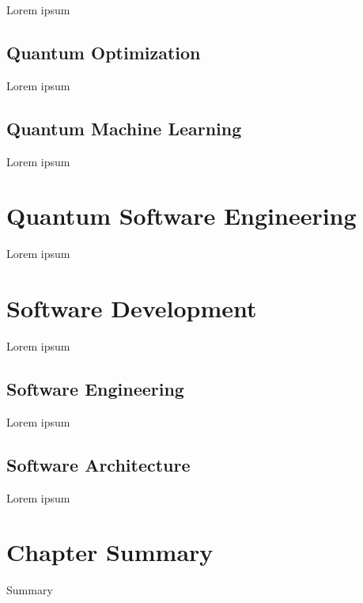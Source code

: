 Lorem ipsum

\subsection{Quantum Optimization}
\label{subsect:background--quantum-optimization}

Lorem ipsum

\subsection{Quantum Machine Learning}
\label{subsect:background--quantum-machine-learning}

Lorem ipsum

\section{Quantum Software Engineering}
\label{sect:background--quantum-software-engineering}

Lorem ipsum

\section{Software Development}
\label{sect:background--software-development}

Lorem ipsum

\subsection{Software Engineering}
\label{subsect:background--software-engineering}

Lorem ipsum

\subsection{Software Architecture}
\label{subsect:background--sofware-architecture}

Lorem ipsum

\section{Chapter Summary}

Summary
